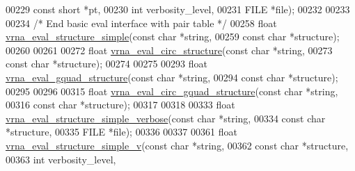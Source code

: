 \begin{DoxyCode}
00229                              \textcolor{keyword}{const} \textcolor{keywordtype}{short}          *pt,
00230                              \textcolor{keywordtype}{int}                  verbosity\_level,
00231                              FILE                 *file);
00232 
00233 
00234 \textcolor{comment}{/* End basic eval interface with pair table */}
00258 \textcolor{keywordtype}{float} \mbox{\hyperlink{group__eval_ga7e5273464b775d4130245681312c1369}{vrna\_eval\_structure\_simple}}(\textcolor{keyword}{const} \textcolor{keywordtype}{char} *\textcolor{keywordtype}{string},
00259                                  \textcolor{keyword}{const} \textcolor{keywordtype}{char} *structure);
00260 
00261 
00272 \textcolor{keywordtype}{float} \mbox{\hyperlink{group__eval_ga3e05a23ddf9b083f4e69881e440d4866}{vrna\_eval\_circ\_structure}}(\textcolor{keyword}{const} \textcolor{keywordtype}{char} *\textcolor{keywordtype}{string},
00273                                \textcolor{keyword}{const} \textcolor{keywordtype}{char} *structure);
00274 
00275 
00293 \textcolor{keywordtype}{float} \mbox{\hyperlink{group__eval_ga3263504825ef4b523eba797c99921df4}{vrna\_eval\_gquad\_structure}}(\textcolor{keyword}{const} \textcolor{keywordtype}{char}  *\textcolor{keywordtype}{string},
00294                                 \textcolor{keyword}{const} \textcolor{keywordtype}{char}  *structure);
00295 
00296 
00315 \textcolor{keywordtype}{float} \mbox{\hyperlink{group__eval_ga9dba2fc5d7e6ad1359a7c2f350589c0e}{vrna\_eval\_circ\_gquad\_structure}}(\textcolor{keyword}{const} \textcolor{keywordtype}{char} *\textcolor{keywordtype}{string},
00316                                      \textcolor{keyword}{const} \textcolor{keywordtype}{char} *structure);
00317 
00318 
00333 \textcolor{keywordtype}{float} \mbox{\hyperlink{group__eval_gaf928bfd96767e1b8033a95a4cc432e39}{vrna\_eval\_structure\_simple\_verbose}}(\textcolor{keyword}{const} \textcolor{keywordtype}{char} *\textcolor{keywordtype}{string},
00334                                          \textcolor{keyword}{const} \textcolor{keywordtype}{char} *structure,
00335                                          FILE       *file);
00336 
00337 
00361 \textcolor{keywordtype}{float} \mbox{\hyperlink{group__eval_gacd6278343e77d13f1d53588e50d303bc}{vrna\_eval\_structure\_simple\_v}}(\textcolor{keyword}{const} \textcolor{keywordtype}{char} *\textcolor{keywordtype}{string},
00362                                    \textcolor{keyword}{const} \textcolor{keywordtype}{char} *structure,
00363                                    \textcolor{keywordtype}{int}        verbosity\_level,

\end{DoxyCode}
